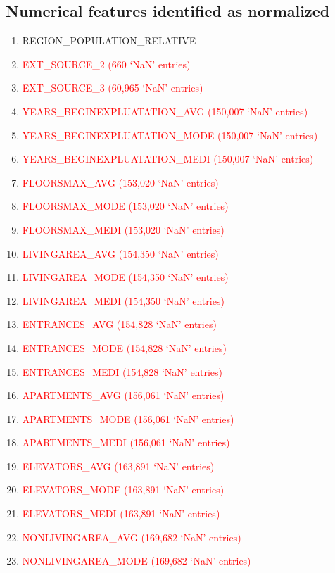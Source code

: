 \documentclass[12pt, letterpaper]{article}
\begin{document}
\begin{appendices}
\subsection{Numerical features identified as normalized}
\label{numericalfeatnormalized}
\footnotesize
\begin{enumerate}
 \item REGION_POPULATION_RELATIVE
 \item \textcolor{red}{EXT_SOURCE_2 (660 `NaN' entries)}
 \item \textcolor{red}{EXT_SOURCE_3 (60,965 `NaN' entries)}
 \item \textcolor{red}{YEARS_BEGINEXPLUATATION_AVG (150,007 `NaN' entries)}
 \item \textcolor{red}{YEARS_BEGINEXPLUATATION_MODE (150,007 `NaN' entries)}
 \item \textcolor{red}{YEARS_BEGINEXPLUATATION_MEDI (150,007 `NaN' entries)}
 \item \textcolor{red}{FLOORSMAX_AVG (153,020 `NaN' entries)}
 \item \textcolor{red}{FLOORSMAX_MODE (153,020 `NaN' entries)}
 \item \textcolor{red}{FLOORSMAX_MEDI (153,020 `NaN' entries)}
 \item \textcolor{red}{LIVINGAREA_AVG (154,350 `NaN' entries)}
 \item \textcolor{red}{LIVINGAREA_MODE (154,350 `NaN' entries)}
 \item \textcolor{red}{LIVINGAREA_MEDI (154,350 `NaN' entries)}
 \item \textcolor{red}{ENTRANCES_AVG (154,828 `NaN' entries)}
 \item \textcolor{red}{ENTRANCES_MODE (154,828 `NaN' entries)}
 \item \textcolor{red}{ENTRANCES_MEDI (154,828 `NaN' entries)}
 \item \textcolor{red}{APARTMENTS_AVG (156,061 `NaN' entries)}
 \item \textcolor{red}{APARTMENTS_MODE (156,061 `NaN' entries)}
 \item \textcolor{red}{APARTMENTS_MEDI (156,061 `NaN' entries)}
 \item \textcolor{red}{ELEVATORS_AVG (163,891 `NaN' entries)}
 \item \textcolor{red}{ELEVATORS_MODE (163,891 `NaN' entries)}
 \item \textcolor{red}{ELEVATORS_MEDI (163,891 `NaN' entries)}
 \item \textcolor{red}{NONLIVINGAREA_AVG (169,682 `NaN' entries)}
 \item \textcolor{red}{NONLIVINGAREA_MODE (169,682 `NaN' entries)}

\end{enumerate}
\end{appendices}
\end{document}
